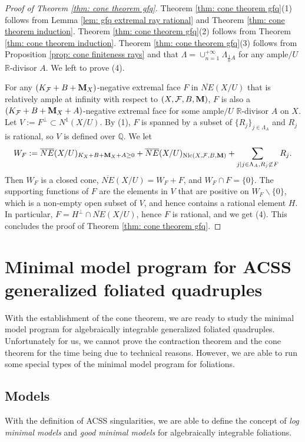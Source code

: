 \documentclass[11pt]{amsart}
\numberwithin{equation}{section}
\newcommand{\Mm}{{\bf{M}}}
\newcommand{\Qq}{\mathbb{Q}}
\newcommand{\Rr}{\mathbb{R}}
\newcommand{\Nlc}{\operatorname{Nlc}}
\newcommand{\Ff}{\mathcal{F}}
\theoremstyle{definition}
\theoremstyle{definition}
\theoremstyle{definition}
\begin{document}
\begin{proof}[Proof of Theorem \ref{thm: cone theorem gfq}]
    Theorem \ref{thm: cone theorem gfq}(1) follows from Lemma \ref{lem: gfq extremal ray rational} and Theorem \ref{thm: cone theorem induction}. Theorem \ref{thm: cone theorem gfq}(2) follows from Theorem \ref{thm: cone theorem induction}. Theorem \ref{thm: cone theorem gfq}(3) follows from Proposition \ref{prop: cone finiteness rays} and that $\Lambda=\cup_{n=1}^{+\infty}\Lambda_{\frac{1}{n}A}$ for any ample$/U$ $\Rr$-divisor $A$. We left to prove (4).

     For any $(K_{\Ff}+B+\Mm_X)$-negative extremal face $F$ in $\overline{NE}(X/U)$ that is relatively ample at infinity with respect to $(X,\Ff,B,\Mm)$, $F$ is also a $(K_{\Ff}+B+\Mm_X+A)$-negative extremal face for some ample$/U$ $\Rr$-divisor $A$ on $X$. Let $V:=F^\bot\subset N^1(X/U)$. By (1), $F$ is spanned by a subset of $\{R_j\}_{j\in\Lambda_A}$ and $R_j$ is rational, so $V$ is defined over $\Qq$. We let
$$W_F:=\overline{NE}(X/U)_{K_X+B+\Mm_X+A\geq 0}+\overline{NE}(X/U)_{\Nlc(X,\Ff,B,\Mm)}+\sum_{j\mid j\in\Lambda_A,R_j\not\subset F}R_j.$$
Then $W_F$ is a closed cone, $\overline{NE}(X/U)=W_F+F$, and $W_F\cap F=\{0\}$. The supporting functions of $F$ are the elements in $V$ that are positive on $W_F\backslash\{0\}$, which is a non-empty open subset of $V$, and hence contains a rational element $H$. In particular, $F=H^\bot\cap \overline{NE}(X/U)$, hence $F$ is rational, and we get (4). This concludes the proof of Theorem \ref{thm: cone theorem gfq}.
\end{proof}


\section{Minimal model program for ACSS generalized foliated quadruples}\label{sec: mmp gfq}

With the establishment of the cone theorem, we are ready to study the minimal model program for algebraically integrable generalized foliated quadruples. Unfortunately for us, we cannot prove the contraction theorem and the cone theorem for the time being due to technical reasons. However, we are able to run some special types of the minimal model program for foliations.

\subsection{Models} With the definition of ACSS singularities, we are able to define the concept of \emph{log minimal models} and \emph{good minimal models} for algebraically integrable foliations.
\end{document}
